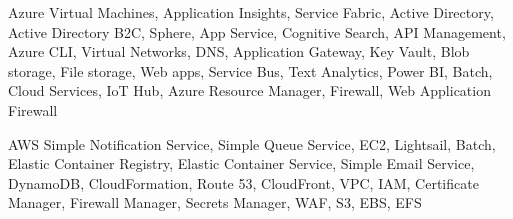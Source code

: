 \begin{cvskills}
  \cvskill
    {Azure} %
    {Virtual Machines, Application Insights, Service Fabric, Active Directory, Active Directory B2C, Sphere, App Service, Cognitive Search, API Management, Azure CLI, Virtual Networks, DNS, Application Gateway, Key Vault, Blob storage, File storage, Web apps, Service Bus, Text Analytics, Power BI, Batch, Cloud Services, IoT Hub, Azure Resource Manager, Firewall, Web Application Firewall} %

  \cvskill
    {AWS} %
    {Simple Notification Service, Simple Queue Service, EC2, Lightsail, Batch, Elastic Container Registry, Elastic Container Service, Simple Email Service, DynamoDB, CloudFormation, Route 53, CloudFront, VPC, IAM, Certificate Manager, Firewall Manager, Secrets Manager, WAF, S3, EBS, EFS} %

\end{cvskills}
